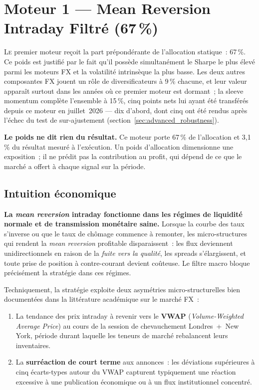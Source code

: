 \section{Moteur 1 --- Mean Reversion Intraday Filtré (67\,\%)}
\label{sec:mr_macro}

\lettrine[lines=2, findent=2pt, nindent=0pt]{L}{e} premier moteur reçoit la part prépondérante de l'allocation statique~: 67\,\%. Ce poids est justifié par le fait qu'il possède simultanément le Sharpe le plus élevé parmi les moteurs FX et la volatilité intrinsèque la plus basse. Les deux autres composantes FX jouent un rôle de diversificateurs à 9\,\% chacune, et leur valeur apparaît surtout dans les années où ce premier moteur est dormant~; la sleeve momentum complète l'ensemble à 15\,\%, cinq points nets lui ayant été transférés depuis ce moteur en juillet~2026 --- dix d'abord, dont cinq ont été rendus après l'échec du test de sur-ajustement (section~\ref{sec:advanced_robustness}).

\begin{insightbox}
\textbf{Le poids ne dit rien du résultat.} Ce moteur porte 67\,\% de l'allocation et 3,1\,\% du résultat mesuré à l'exécution. Un poids d'allocation dimensionne une exposition~; il ne prédit pas la contribution au profit, qui dépend de ce que le marché a offert à chaque signal sur la période.
\end{insightbox}

\subsection{Intuition économique}

\begin{thesisbox}
\textbf{La \emph{mean reversion} intraday fonctionne dans les régimes de liquidité normale et de transmission monétaire saine.} Lorsque la courbe des taux s'inverse ou que le taux de chômage commence à remonter, les micro-structures qui rendent la \emph{mean reversion} profitable disparaissent~: les flux deviennent unidirectionnels en raison de la \emph{fuite vers la qualité}, les spreads s'élargissent, et toute prise de position à contre-courant devient coûteuse. Le filtre macro bloque précisément la stratégie dans ces régimes.
\end{thesisbox}

Techniquement, la stratégie exploite deux asymétries micro-structurelles bien documentées dans la littérature académique sur le marché FX~:

\begin{enumerate}
\item La tendance des prix intraday à revenir vers le \textbf{VWAP} (\emph{Volume-Weighted Average Price}) au cours de la session de chevauchement Londres~+~New York, période durant laquelle les teneurs de marché rebalancent leurs inventaires.
\item La \textbf{surréaction de court terme} aux annonces~: les déviations supérieures à cinq écarts-types autour du VWAP capturent typiquement une réaction excessive à une publication économique ou à un flux institutionnel concentré.
\end{enumerate}

